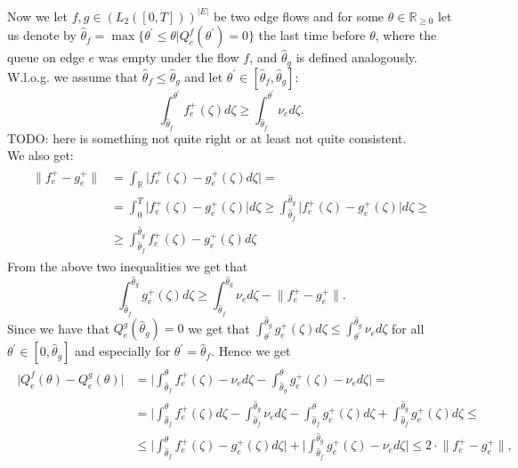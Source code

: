 \documentclass[reqno,openany]{amsbook}
\theoremstyle{definition}
\theoremstyle{plain}
\begin{document}
Now we let $f, g \in (L_2([0,T]))^{\lvert E \rvert}$ be two edge flows and for some $\theta \in \mathbb{R}_{\geq 0}$ let us denote by $\hat{\theta}_f = \max\{\theta^{\prime} \leq \theta \vert Q_e^f(\theta^{\prime}) = 0\}$ the last time before $\theta$, where the queue on edge $e$ was empty under the flow $f$, and $\hat{\theta}_g$ is defined analogously.\\
W.l.o.g. we assume that $\hat{\theta}_f \leq \hat{\theta}_g$ and let $\theta^{\prime} \in  [\hat{\theta}_f, \hat{\theta}_g]$:
\[\int_{\hat{\theta}_f}^{\theta^{\prime}} f_e^+(\zeta) d\zeta \geq \int_{\hat{\theta}_f}^{\theta^{\prime}} \nu_e d\zeta. \]
TODO: here is something not quite right or at least not quite consistent.\\
We also get:
\begin{align}
	\begin{split}
		\lVert f_e^+ - g_e^+ \rVert &= \int_{\mathbb{R}} \lvert f_e^+(\zeta) - g_e^+(\zeta) d\zeta \rvert =\\
		&= \int_0^T \lvert f_e^+(\zeta) - g_e^+(\zeta) \rvert d\zeta \geq \int_{\hat{\theta}_f}^{\hat{\theta}_g} \lvert f_e^+				(\zeta) - g_e^+(\zeta) \rvert d\zeta \geq\\
		&\geq  \int_{\hat{\theta}_f}^{\hat{\theta}_g} f_e^+(\zeta) - g_e^+(\zeta) d\zeta
	\end{split}
\end{align}
From the above two inequalities we get that
\[\int_{\hat{\theta}_f}^{\hat{\theta}_g} g_e^+(\zeta) d\zeta \geq \int_{\hat{\theta}_f}^{\hat{\theta}_g} \nu_e d\zeta - \lVert f_e^+ - g_e^+ \rVert. \]
Since we have that $Q_e^g(\hat{\theta}_g) = 0$ we get that $\int_{\theta^{\prime}}^{\hat{\theta}_g} g_e^+(\zeta) d\zeta \leq \int_{\theta^{\prime}}^{\hat{\theta}_g} \nu_e d\zeta$ for all $\theta^{\prime} \in [0, \hat{\theta}_g]$ and especially for $\theta^{\prime} = \hat{\theta}_f$. Hence we get 
\begin{align}
	\begin{split}
		\lvert Q_e^f(\theta) - Q_e^g(\theta) \rvert &= \lvert \int_{\hat{\theta}_f}^{\theta} f_e^+(\zeta) - \nu_e d\zeta - 
		\int_{\hat{\theta}_g}^{\theta} g_e^+(\zeta) - \nu_e d\zeta \rvert =\\
		&= \lvert \int_{\hat{\theta}_f}^{\theta} f_e^+(\zeta) d\zeta - \int_{\hat{\theta}_f}^{\hat{\theta}_g} \nu_e d\zeta
		- \int_{\hat{\theta}_f}^{\theta} g_e^+(\zeta) d\zeta + \int_{\hat{\theta}_f}^{\hat{\theta}_g} g_e^+(\zeta) d\zeta 					\leq\\
		&\leq \lvert \int_{\hat{\theta}_f}^{\theta} f_e^+(\zeta) - g_e^+(\zeta) d\zeta \rvert + \lvert 
		\int_{\hat{\theta}_f}^{\hat{\theta}_g} g_e^+(\zeta) - \nu_e d\zeta \rvert \leq 2 \cdot \lVert f_e^+ - g_e^+ \rVert,
	\end{split}
\end{align}
\end{document}
